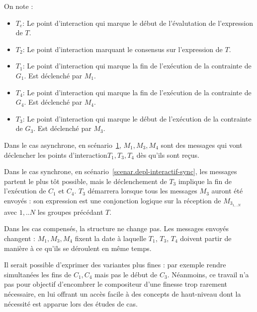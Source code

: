 \documentclass[10pt]{article}
\newcommand\trigger{point d'interaction\xspace}
\newcommand\triggers{points d'interaction\xspace}
\begin{document}
 On note : 
\begin{itemize}
    \item $T_e $: Le \trigger qui marque le début de l'évalutation de l'expression de $T$.
	\item $T_2 $: Le \trigger marquant le consensus sur l'expression de $T$.
    \item $T_1 $: Le \trigger qui marque la fin de l'exécution de la contrainte de $G_1$. 
    Est déclenché par $M_1$.
    \item $T_4 $: Le \trigger qui marque la fin de l'exécution de la contrainte de $G_4$.
    Est déclenché par $M_4$.
    \item $T_3 $: Le \trigger qui marque le début de l'exécution de la contrainte de $G_3$.
    Est déclenché par $M_3$.
\end{itemize}

Dans le cas asynchrone, en scénario~\ref{scenar.depl-interactif-async}, $M_1, M_3, M_4$ sont des messages qui vont déclencher les \triggers $T_1, T_3, T_4$ dès qu'ils sont reçus.

Dans le cas synchrone, en scénario~\ref{scenar.depl-interactif-sync}, les messages partent le plus tôt possible, mais le déclenchement de $T_3$ implique la fin de l'exécution de $C_1$ et $C_4$. $T_3$ démarrera lorsque tous les messages $M_3$ auront été envoyés : son expression est une conjonction logique sur la réception de $M_{3_{1,..N}}$ avec $1,..N$ les groupes précédant $T$.

Dans les cas compensés, la structure ne change pas. 
Les messages envoyés changent : $M_1, M_3, M_4$ fixent la date à laquelle $T_1$, $T_3$, $T_4$ doivent partir de manière à ce qu'ils se déroulent en même temps.

Il serait possible d'exprimer des variantes plus fines : par exemple rendre simultanées les fins de $C_1, C_4$ mais pas le début de $C_3$. 
Néanmoins, ce travail n'a pas pour objectif d'encombrer le compositeur d'une finesse trop rarement nécessaire, en lui offrant un accès facile à des concepts de haut-niveau dont la nécessité est apparue lors des études de cas.


\begin{figure}[h]
	\centering
		\begin{tikzpicture}
		
		\end{tikzpicture}
        \label{scenar.depl-interactif-async}
\end{figure}
\end{document}
